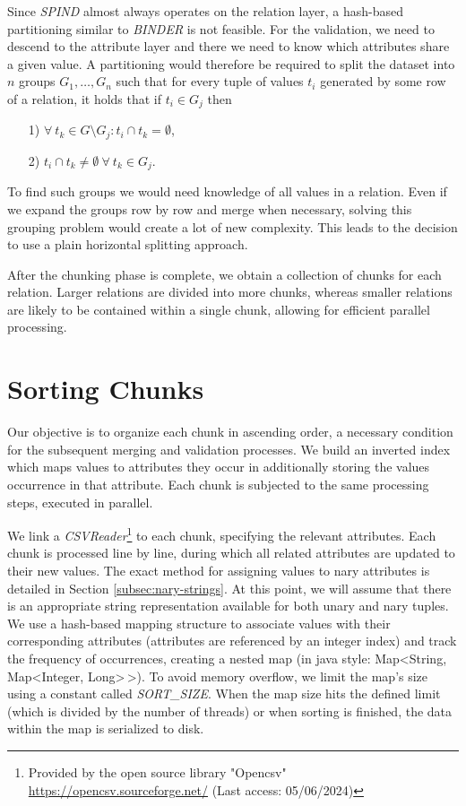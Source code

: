Since \textit{SPIND} almost always operates on the relation layer, a hash-based partitioning similar to \textit{BINDER} is not feasible. For the validation, we need to descend to the attribute layer and there we need to know which attributes share a given value. A partitioning would therefore be required to split the dataset into $n$ groups $G_1, \dots, G_n$ such that for every tuple of values $t_i$ generated by some row of a relation, it holds that if $t_i \in G_j$ then 
\begin{itemize}
    \item[1)] $\forall \: t_k \in G \setminus G_j : t_i \cap t_k = \emptyset$,
    \item[2)] $t_i \cap t_k \not = \emptyset \: \forall \: t_k \in G_j$.
\end{itemize}
To find such groups we would need knowledge of all values in a relation. Even if we expand the groups row by row and merge when necessary, solving this grouping problem would create a lot of new complexity. This leads to the decision to use a plain horizontal splitting approach.

After the chunking phase is complete, we obtain a collection of chunks for each relation. Larger relations are divided into more chunks, whereas smaller relations are likely to be contained within a single chunk, allowing for efficient parallel processing.

\section{Sorting Chunks} \label{subsec:spind_sort}
Our objective is to organize each chunk in ascending order, a necessary condition for the subsequent merging and validation processes. We build an inverted index which maps values to attributes they occur in additionally storing the values occurrence in that attribute. Each chunk is subjected to the same processing steps, executed in parallel.

We link a \textit{CSVReader}\footnote{Provided by the open source library "Opencsv" \url{https://opencsv.sourceforge.net/} (Last access: 05/06/2024)} to each chunk, specifying the relevant attributes. Each chunk is processed line by line, during which all related attributes are updated to their new values. The exact method for assigning values to nary attributes is detailed in Section \ref{subsec:nary-strings}. At this point, we will assume that there is an appropriate string representation available for both unary and nary tuples. We use a hash-based mapping structure to associate values with their corresponding attributes (attributes are referenced by an integer index) and track the frequency of occurrences, creating a nested map (in java style: Map<String, Map<Integer, Long>$\!\,$>). To avoid memory overflow, we limit the map's size using a constant called \textit{SORT\_SIZE}. When the map size hits the defined limit (which is divided by the number of threads) or when sorting is finished, the data within the map is serialized to disk.


